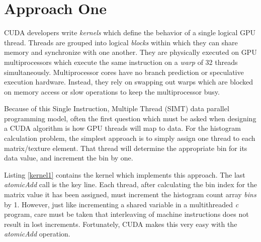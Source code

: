 \documentclass{article}
\begin{document}
\section{Approach One}\label{approach1}

CUDA developers write \emph{kernels} which define the behavior of a single logical GPU thread. Threads are grouped into logical \emph{blocks} within which they can share memory and synchronize with one another. They are physically executed on GPU multiprocessors which execute the same instruction on a \emph{warp} of 32 threads simultaneously. Multiprocessor cores have no branch prediction or speculative execution hardware. Instead, they rely on swapping out warps which are blocked on memory access or slow operations to keep the multiprocessor busy. 

Because of this Single Instruction, Multiple Thread (SIMT) data parallel programming model, often the first question which must be asked when designing a CUDA algorithm is how GPU threads will map to data. For the histogram calculation problem, the simplest approach is to simply assign one thread to each matrix/texture element. That thread will determine the appropriate bin for its data value, and increment the bin by one.

Listing \ref{kernel1} contains the kernel which implements this approach. The last \emph{atomicAdd} call is the key line. Each thread, after calculating the bin index for the matrix value it has been assigned, must increment the histogram count array \emph{bins} by 1. However, just like incrementing a shared variable in a multithreaded \emph{c} program, care must be taken that interleaving of machine instructions does not result in lost increments. Fortunately, CUDA makes this very easy with the \emph{atomicAdd} operation\cite{arithmetic-functions}.
\end{document}
